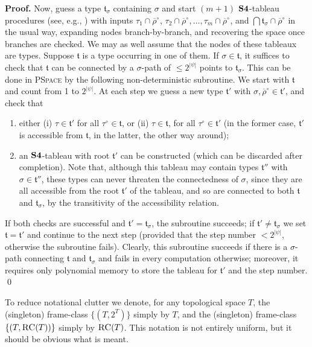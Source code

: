 \documentclass{LMCS}
\renewenvironment{proof}{\par\noindent\textbf{Proof.}}{\mbox{}\qed\par\medskip}
\theoremstyle{plain}
\newcommand{\ti}[2][]{#2^{\circ_{#1}}}
\newcommand{\compl}[2][]{\overline{#2}}
\newcommand{\PSpace}{\textsc{PSpace}}
\newcommand{\tp}{\mathfrak{t}}
\begin{document}
\begin{proof}
Now, guess a type $\tp_{\sigma}$ containing $\sigma$ and start $(m+1)$
${\bf S4}$-tableau procedures (see, e.g.,
\cite{Fitting83,Gore99}) with inputs $\tau_1 \cap
\ti{\compl{\rho}}$, $\tau_2 \cap \ti{\compl{\rho}},\ldots,\tau_m
\cap \ti{\compl{\rho}}$, and $\bigcap \tp_{\sigma} \cap
\ti{\compl{\rho}}$ in the usual way, expanding nodes branch-by-branch, and
recovering the space once branches are checked. We may as well assume
that the nodes of these tableaux are types. Suppose $\tp$ is a type
occurring in one of them.  If $\sigma\in\tp$, it suffices to check
that $\tp$ can be connected by a $\sigma$-path of $\le 2^{|\psi|}$
points to $\tp_\sigma$. This can be done in \PSpace{} by the following
non-deterministic subroutine. We start with $\tp$ and count from 1 to
$2^{|\psi|}$. At each step we guess a new type $\tp'$ with
$\sigma,\ti{\compl{\rho}}\in \tp'$, and
check that
\begin{enumerate}[$\bullet$]
\item either (i) $\tau \in \tp'$ for all $\ti{\tau} \in \tp$, or (ii)
  $\tau \in \tp$, for all $\ti{\tau} \in \tp'$ (in the former case,
  $\tp'$ is accessible from $\tp$, in the latter, the other way
  around);
\item an ${\bf S4}$-tableau with root $\tp'$ can be constructed (which
  can be discarded after completion). Note that, although this tableau
  may contain types $\tp''$ with $\sigma \in \tp''$, these types can
  never threaten the connectedness of $\sigma$, since they are all
  accessible from the root $\tp'$ of the tableau, and so are connected
  to both $\tp$ and $\tp_\sigma$, by the transitivity of the
  accessibility relation.
\end{enumerate}
If both checks are successful and $\tp' = \tp_\sigma$, the subroutine
succeeds; if $\tp' \ne \tp_\sigma$ we set $\tp = \tp'$ and continue to
the next step (provided that the step number $< 2^{|\psi|}$, otherwise
the subroutine fails). Clearly, this subroutine succeeds if there is a
$\sigma$-path connecting $\tp$ and $\tp_\sigma$ and fails in every
computation otherwise; moreover, it requires only polynomial memory to
store the tableau for $\tp'$ and the step number.
\end{proof}

To reduce notational clutter
we denote, for any topological space $T$, the (singleton)
frame-class $\{(T, 2^T)\}$ simply by $T$, and the (singleton)
frame-class $\{(T, \textsc{RC}(T))\}$ simply by $\textsc{RC}(T)$. This notation is not
entirely uniform, but it should be obvious what is meant.
\end{document}
